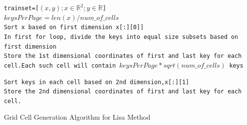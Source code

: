 \begin{algorithm}[H]
    \SetAlgoLined
     \texttt{trainset=[$(x,y);x \in \mathbb{R}^{2};y \in \mathbb{R}$]} \\
     \texttt{$keysPerPage =  len(x) / num\_of\_cells $}\\
     \texttt{Sort x based on first dimension x[:][0]]}\\
     \texttt{In first for loop, divide the keys into equal size subsets based on first dimension }\\
     {
        \texttt{Store the 1st dimensional coordinates of first and last key for each cell.Each such cell will contain $keysPerPage*sqrt(num\_of\_cells)$ keys } \\
		
     }
     
     \texttt{Sort keys in each cell based on 2nd dimension,x[:][1] }\\
     
      {
         {
            \texttt{Store the 2nd dimensional coordinates of first and last key for each cell.} \\
		 }
      }
     \caption{Grid Cell Generation Algorithm for Lisa Method}
     \label{Training_Lisa_Baseline}
\end{algorithm}







